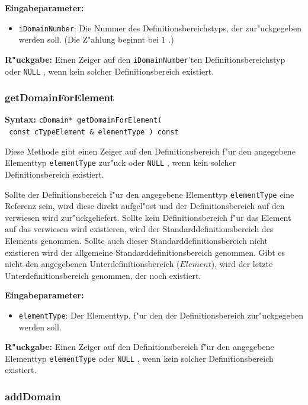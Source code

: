 \bigskip\noindent
\textbf{Eingabeparameter:}
\begin{itemize}
 \item \verb|iDomainNumber|: Die Nummer des Definitionsbereichstyps, der zur"uckgegeben werden soll. (Die Z"ahlung beginnt bei $1$ .)
\end{itemize}

\bigskip\noindent
\textbf{R"uckgabe:} Einen Zeiger auf den \verb|iDomainNumber|'ten Definitionsbereichstyp oder \verb|NULL| , wenn kein solcher Definitionsbereich existiert.



\subsubsection{getDomainForElement}

\textbf{Syntax:} \verb|cDomain* getDomainForElement(| \\\verb| const cTypeElement & elementType ) const|

\bigskip\noindent
Diese Methode gibt einen Zeiger auf den Definitionsbereich f"ur den angegebene Elementtyp \verb|elementType| zur"uck oder \verb|NULL| , wenn kein solcher Definitionsbereich existiert.

Sollte der Definitionsbereich f"ur den angegebene Elementtyp \verb|elementType| eine Referenz sein, wird diese direkt aufgel"ost und der Definitionsbereich auf den verwiesen wird zur"uckgeliefert.
Sollte kein Definitionsbereich f"ur das Element auf das verwiesen wird existieren, wird der Standarddefinitionsbereich des Elements genommen. Sollte auch dieser Standarddefinitionsbereich nicht existieren wird der allgemeine Standarddefinitionsbereich genommen.
Gibt es nicht den angegebenen Unterdefinitionsbereich ($Element$), wird der letzte Unterdefinitionsbereich genommen, der noch existiert.

\bigskip\noindent
\textbf{Eingabeparameter:}
\begin{itemize}
 \item \verb|elementType|: Der Elementtyp, f"ur den der Definitionsbereich zur"uckgegeben werden soll.
\end{itemize}

\bigskip\noindent
\textbf{R"uckgabe:} Einen Zeiger auf den Definitionsbereich f"ur den angegebene Elementtyp \verb|elementType| oder \verb|NULL| , wenn kein solcher Definitionsbereich existiert.


\subsubsection{addDomain}

